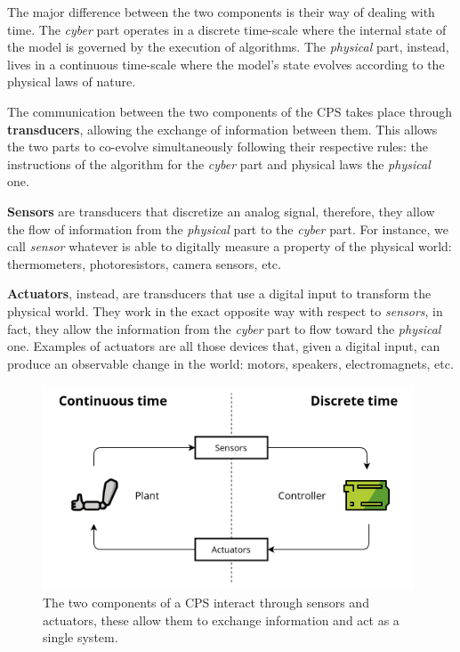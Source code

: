The major difference between the two components is their way of dealing with time.
The \textit{cyber} part operates in a discrete time-scale where the internal state of the model is governed by the execution of algorithms.
The \textit{physical} part, instead, lives in a continuous time-scale where the model's state evolves according to the physical laws of nature.

The communication between the two components of the CPS takes place through \textbf{transducers}, allowing the exchange of information between them.
This allows the two parts to co-evolve simultaneously following their respective rules: the instructions of the algorithm for the \textit{cyber} part and physical laws the \textit{physical} one.

\textbf{Sensors} are transducers that discretize an analog signal, therefore, they allow the flow of information from the \textit{physical} part to the \textit{cyber} part.
For instance, we call \textit{sensor} whatever is able to digitally measure a property of the physical world: thermometers, photoresistors, camera sensors, etc.

\textbf{Actuators}, instead, are transducers that use a digital input to transform the physical world.
They work in the exact opposite way with respect to \textit{sensors}, in fact, they allow the information from the \textit{cyber} part to flow toward the \textit{physical} one.
Examples of actuators are all those devices that, given a digital input, can produce an observable change in the world: motors, speakers, electromagnets, etc.

\begin{figure}[H]
	\centering
	\includegraphics[width=11cm, keepaspectratio]{img/2_1_cps.png}
	\caption{The two components of a CPS interact through sensors and actuators, these allow them to exchange information and act as a single system.}
\end{figure}

